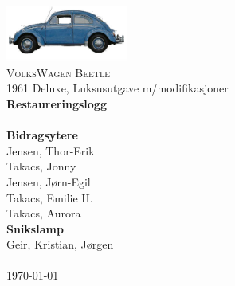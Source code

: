 \documentclass[12pt,a4paper] {report}
\begin{document}
\begin{titlepage}
	\begin{center}

		\includegraphics[width=0.3\textwidth]{img/vw_beetle_logo2.jpg}~\\[1cm]

		\textsc{\LARGE VolksWagen Beetle}\\[.1cm]
		\textsc{\Large }1961 Deluxe, Luksusutgave m/modifikasjoner\\[3.5cm]

		{ \huge \bfseries Restaureringslogg}\\[0.5cm]
		\HRule \\[0.4cm]
		{\large \textbf{Bidragsytere}}\\
		{\large Jensen, Thor-Erik}\\
		{\large Takacs, Jonny}\\
		{\large Jensen, J\o rn-Egil}\\
		{\large Takacs, Emilie H.}\\
		{\large Takacs, Aurora}\\[0.6cm]
		{\large \textbf{Snikslamp}}\\
		{\large Geir, Kristian, Jørgen}\\[0.2cm]
		\HRule \\[1.5cm]

		\vfill
		{\large \today}

	\end{center}
\end{titlepage}

\tableofcontents %



% 
% 
% 
\end{document}
